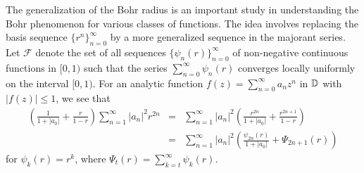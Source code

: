 \documentclass[11pt,reqno]{amsart}
\newtheorem{open problem}{Open problem}[section]
\newcommand{\D}{{\Bbb{D}}}
\newcommand{\beas}{\begin{eqnarray*}}
\newcommand{\eeas}{\end{eqnarray*}}
\numberwithin{equation}{section}
\begin{document}
\indent The generalization of the Bohr radius is an important study in understanding the Bohr phenomenon for various classes of functions. The idea involves replacing the basis sequence $\{r^n\}_{n=0}^\infty$ by a  more generalized sequence in the majorant series.\\[2mm]
Let $\mathcal{F}$ denote the set of all sequences $\{\psi_n(r)\}_{n=0}^\infty$ of non-negative continuous functions in $[0,1)$ such that the series $\sum_{n=0}^\infty \psi_n(r)$ 
converges locally uniformly on the interval $[0, 1)$. For an analytic function $f(z)=\sum_{n=0}^\infty a_n z^n$ in $\D$ with $|f(z)|\leq 1$, we see that 
\beas \left(\frac{1}{1+|a_0|}+\frac{r}{1-r}\right)\sum_{n=1}^\infty |a_n|^2 r^{2n}&=&\sum_{n=1}^\infty |a_n|^2\left(\frac{r^{2n}}{1+|a_0|}+\frac{r^{2n+1}}{1-r}\right)\\[2mm]
&=&\sum_{n=1}^\infty |a_n|^2\left(\frac{\psi_{2n}(r)}{1+|a_0|}+\Psi_{2n+1}(r)\right)\eeas
for $\psi_k(r)=r^k$, where $\Psi_t(r)=\sum_{k=t}^\infty \psi_k(r)$.
\end{document}
